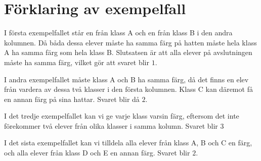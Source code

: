 \section*{Förklaring av exempelfall}
I första exempelfallet står en från klass A och en från klass B i den andra kolumnen. Då båda dessa elever måste ha samma färg på hatten måste hela klass A ha samma färg som hela klass B. Slutsatsen är att alla elever på avslutningen måste ha samma färg, vilket gör att svaret blir $1$.

I andra exempelfallet måste klass A och B ha samma färg, då det finns en elev från vardera av dessa två klasser i den första kolumnen. Klass C kan däremot få en annan färg på sina hattar. Svaret blir då $2$.

I det tredje exempelfallet kan vi ge varje klass varsin färg, eftersom det inte förekommer två elever från olika klasser i samma kolumn. Svaret blir $3$

I det sista exempelfallet kan vi tilldela alla elever från klass A, B och C en färg, och alla elever från klass D och E en annan färg. Svaret blir $2$.
